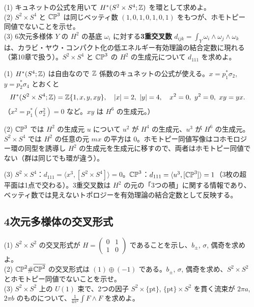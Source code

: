 \begin{problem}[難易度 A]\label{ch06-prob-kunneth}
(1) キュネットの公式を用いて $H^*(S^2\times S^4;\mathbb{Z})$ を環として求めよ。\\
(2) $S^2\times S^4$ と $\mathbb{CP}^3$ は同じベッティ数 $(1,0,1,0,1,0,1)$ をもつが、ホモトピー同値でないことを示せ。\\
(3) 6次元多様体 $Y$ の $H^2$ の基底 $\omega_i$ に対する\textbf{3重交叉数} $d_{ijk}=\int_Y\omega_i\wedge\omega_j\wedge\omega_k$ は、カラビ・ヤウ・コンパクト化の低エネルギー有効理論の結合定数に現れる（第10章で扱う）。$S^2\times S^4$ と $\mathbb{CP}^3$ の $H^2$ の生成元について $d_{111}$ を求めよ。
\end{problem}

\begin{solution}
(1) $H^*(S^4;\mathbb{Z})$ は自由なので $\mathbb{Z}$ 係数のキュネットの公式が使える。$x=p_1^*\sigma_2$, $y=p_2^*\sigma_4$ とおくと
\[
H^*(S^2\times S^4;\mathbb{Z})=\mathbb{Z}\{1,x,y,xy\},\quad\lvert x\rvert=2,\ \lvert y\rvert=4,\quad x^2=0,\ y^2=0,\ xy=yx .
\]
（$x^2=p_1^*(\sigma_2^2)=0$ など。$xy$ は $H^6$ の生成元。）

(2) $\mathbb{CP}^3$ では $H^2$ の生成元 $u$ について $u^2$ が $H^4$ の生成元、$u^3$ が $H^6$ の生成元。$S^2\times S^4$ では $H^2$ の任意の元 $mx$ の平方は $0$。ホモトピー同値写像はコホモロジー環の同型を誘導し $H^2$ の生成元を生成元に移すので、両者はホモトピー同値でない（群は同じでも環が違う）。

(3) $S^2\times S^4$：$d_{111}=\langle x^3,[S^2\times S^4]\rangle=0$。$\mathbb{CP}^3$：$d_{111}=\langle u^3,[\mathbb{CP}^3]\rangle=1$（3枚の超平面は1点で交わる）。3重交叉数は $H^2$ の元の「3つの積」に関する情報であり、ベッティ数では見えないトポロジーを有効理論の結合定数として反映する。
\end{solution}

\subsection{4次元多様体の交叉形式}

\begin{problem}[難易度 B]\label{ch06-prob-s2s2}
(1) $S^2\times S^2$ の交叉形式が $H=\begin{pmatrix}0&1\\1&0\end{pmatrix}$ であることを示し、$b_\pm$, $\sigma$, 偶奇を求めよ。\\
(2) $\mathbb{CP}^2\#\overline{\mathbb{CP}^2}$ の交叉形式は $(1)\oplus(-1)$ である。$b_\pm$, $\sigma$, 偶奇を求め、$S^2\times S^2$ とホモトピー同値でないことを示せ。\\
(3) $S^2\times S^2$ 上の $U(1)$ 束で、2つの因子 $S^2\times\{\mathrm{pt}\}$, $\{\mathrm{pt}\}\times S^2$ を貫く流束が $2\pi a$, $2\pi b$ のものについて、$\frac{1}{4\pi^2}\int F\wedge F$ を求めよ。
\end{problem}

